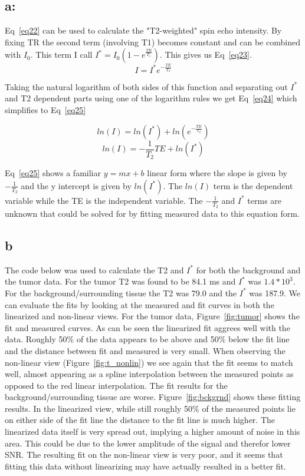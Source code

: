 \documentclass[12pt]{article}
\begin{document}
\subsection{a: }
Eq~\ref{eq22} can be used to calculate the "T2-weighted" spin echo intensity. By fixing TR the second term (involving T1) becomes constant and can be combined with $I_0$. This term I call $I^* = I_0(1-e^{\frac{TR}{T_1}})$. This gives us Eq~\ref{eq23}.
\begin{equation}
I = I^*e^{-\frac{TE}{T_2}}
\label{eq23}
\end{equation}

Taking the natural logarithm of both sides of this function and separating out $I^*$ and T2 dependent parts using one of the logarithm rules we get Eq~\ref{eq24} which simplifies to Eq~\ref{eq25}

\begin{equation}
ln(I) = ln(I^*) + ln(e^{-\frac{TE}{T_2}})
\label{eq24}
\end{equation}
\begin{equation}
ln(I) = -\frac{1}{T_2}TE + ln(I^*) 
\label{eq25}
\end{equation}

Eq~\ref{eq25} shows a familiar $y = mx + b$ linear form where the slope is given by $ -\frac{1}{T_2}$ and the y intercept is given by $ln(I^*)$. The $ln(I)$ term is the dependent variable while the TE is the independent variable. The $ -\frac{1}{T_2}$ and $I^*$ terms are unknown that could be solved for by fitting measured data to this equation form.

\subsection{b}
The code below was used to calculate the T2 and $I^*$ for both the background and the tumor data. For the tumor T2 was found to be 84.1 ms and $I^*$ was $1.4*10^3$. For the background/surrounding tissue the T2 was 79.0 and the $I^*$ was 187.9. We can evaluate the fits by looking at the measured and fit curves in both the linearized and non-linear views. For the tumor data, Figure~\ref{fig:tumor} shows the fit and measured curves. As can be seen the linearized fit aggrees well with the data. Roughly 50\% of the data appears to be above and 50\% below the fit line and the distance between fit and measured is very small. When observing the non-linear view (Figure~\ref{fig:t_nonlin}) we see again that the fit seems to match well, almost appearing as a spline interpolation between the measured points as opposed to the red linear interpolation. The fit results for the background/surrounding tissue are worse. Figure~\ref{fig:bckgrnd} shows these fitting results. In the linearized view, while still roughly 50\% of the measured points lie on either side of the fit line the distance to the fit line is much higher. The linearized data itself is very spread out, implying a higher amount of noise in this area. This could be due to the lower amplitude of the signal and therefor lower SNR. The resulting fit on the non-linear view is very poor, and it seems that fitting this data without linearizing may have actually resulted in a better fit.
\end{document}
